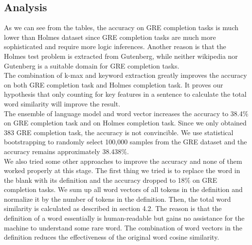 \documentclass[11pt]{article}
\begin{document}
\subsection{Analysis}
As we can see from the tables, the accuracy on GRE completion tasks is much lower than Holmes dataset since GRE completion tasks are much more sophisticated and require more logic inferences. Another reason is that the Holmes test problem is extracted from Gutenberg, while neither wikipedia nor Gutenberg is a suitable domain for GRE completion tasks.\\
The combination of k-max and keyword extraction greatly improves the accuracy on both GRE completion task and Holmes completion task. It proves our hypothesis that only counting for key features in a sentence to calculate the total word similarity will improve the result.
\\ The ensemble of language model and word vector increases the accuracy to 38.4$\%$ on GRE completion task and on Holmes completion task. Since we only obtained 383 GRE completion task, the accuracy is not convincible. We use statistical bootstrapping to randomly select 100,000 samples from the GRE dataset and the accuracy remains approximately 38.438$\%$.\\
We also tried some other approaches to improve the accuracy and none of them worked properly at this stage. The first thing we tried is to replace the word in the blank with its definition and the accuracy dropped to 18$\%$ on GRE completion tasks. We sum up all word vectors of all tokens in the definition and normalize it by the number of tokens in the definition. Then, the total word similarity is calculated as described in section 4.2. The reason is that the definition of a word essentially is human-readable but gains no assistance for the machine to understand some rare word. The combination of word vectors in the definition reduces the effectiveness of the original word cosine similarity.\\
\end{document}
